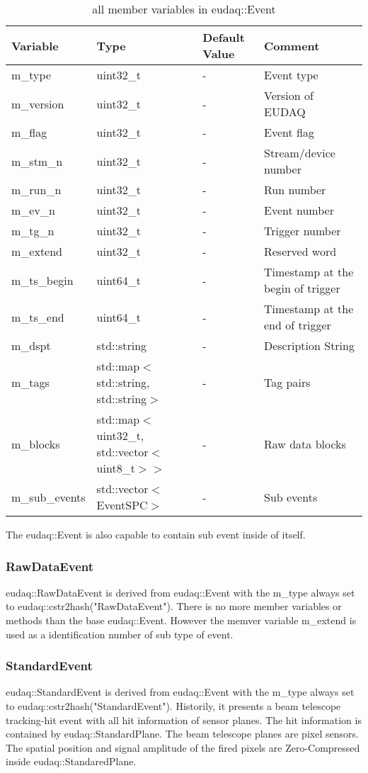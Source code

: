\begin{table}[!h]
{\footnotesize
\begin{tabular}{l|l|p{2cm}|p{5.5cm}}
Variable & Type & Default Value & Comment \\
\hline
m\_type & uint32\_t & - & Event type\\
m\_version & uint32\_t & - & Version of EUDAQ\\
m\_flag & uint32\_t & - & Event flag\\
m\_stm\_n & uint32\_t & - & Stream/device number\\
m\_run\_n & uint32\_t & - & Run number\\
m\_ev\_n & uint32\_t & - & Event number\\
m\_tg\_n & uint32\_t & - & Trigger number\\
m\_extend & uint32\_t & - & Reserved word\\
m\_ts\_begin & uint64\_t & - & Timestamp at the begin of trigger\\
m\_ts\_end & uint64\_t & - & Timestamp at the end of trigger\\
m\_dspt & std::string & - & Description String\\
m\_tags & std::map$<$std::string, std::string$>$& - & Tag pairs\\
m\_blocks & std::map$<$uint32\_t, std::vector$<$uint8\_t$>>$ & - & Raw data blocks\\
m\_sub\_events & std::vector$<$EventSPC$>$& - & Sub events\\
\end{tabular}
\caption{all member variables in eudaq::Event}
\label{tab:eventvarialbe}
}
\end{table}

The eudaq::Event is also capable to contain sub event inside of itself. 

\subsubsection{RawDataEvent}\label{sec:convrawdata}
eudaq::RawDataEvent is derived from eudaq::Event with the m\_type always set to eudaq::cstr2hash("RawDataEvent"). There is no more member variables or methods than the base eudaq::Event. However the memver variable m\_extend is used as a identification number of sub type of event.

\subsubsection{StandardEvent}\label{sec:convstddata}
eudaq::StandardEvent is derived from eudaq::Event with the m\_type always set to eudaq::cstr2hash("StandardEvent"). Historily, it presents a beam telescope tracking-hit event with all hit information of sensor planes. The hit information is contained by eudaq::StandardPlane. The beam telescope planes are pixel sensors. The spatial position and signal amplitude of the fired pixels are Zero-Compressed inside eudaq::StandaredPlane.


